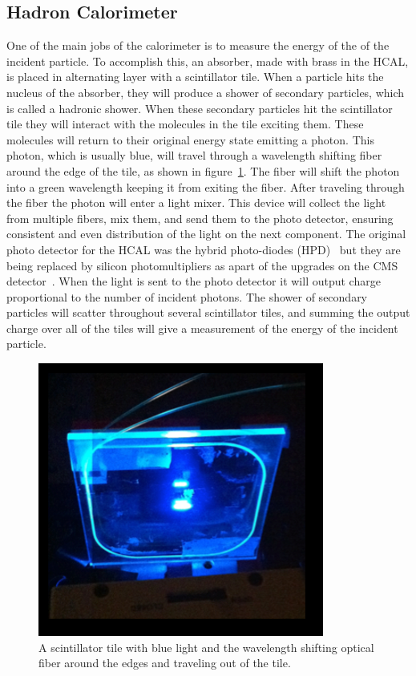 \subsection{Hadron Calorimeter} \label{HCAL}
One of the main jobs of the calorimeter is to measure the energy of the of the incident particle. To accomplish this, an absorber, made with brass in the HCAL, is placed in alternating layer with a scintillator tile. When a particle hits the nucleus of the absorber, they will produce a shower of secondary particles, which is called a hadronic shower. When these secondary particles hit the scintillator tile they will interact with the molecules in the tile exciting them. These molecules will return to their original energy state emitting a photon. This photon, which is usually blue, will travel through a wavelength shifting fiber around the edge of the tile, as shown in figure~\ref{fig:Tile}. The fiber will shift the photon into a green wavelength keeping it from exiting the fiber. After traveling through the fiber the photon will enter a light mixer. This device will collect the light from multiple fibers, mix them, and send them to the photo detector, ensuring consistent and even distribution of the light on the next component. The original photo detector for the HCAL was the hybrid photo-diodes (HPD)~\cite{HPD} but they are being replaced by silicon photomultipliers as apart of the upgrades on the CMS detector~\cite{HCALPhase1}. When the light is sent to the photo detector it will output charge proportional to the number of incident photons. The shower of secondary particles will scatter throughout several scintillator tiles, and summing the output charge over all of the tiles will give a measurement of the energy of the incident particle. 
\begin{figure}
\centering
\includegraphics[width=0.6\linewidth]{Figures/Tile.png}
\caption{A scintillator tile with blue light and the wavelength shifting optical fiber around the edges and traveling out of the tile.}
\label{fig:Tile}
\end{figure}


